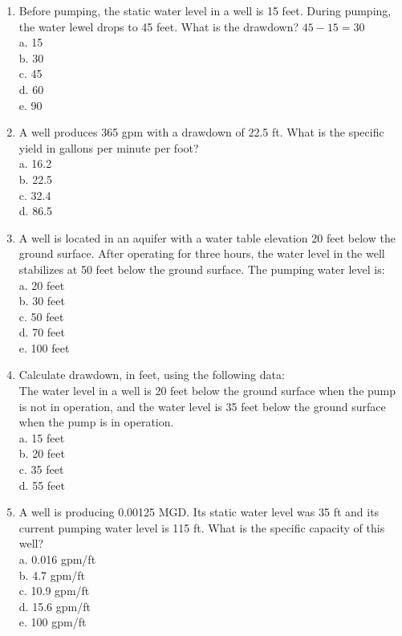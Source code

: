 \documentclass{article}
\begin{document}
\begin{enumerate}
\item Before pumping, the static water level in a well is 15 feet. During pumping, the water lewel drops to 45 feet. What is the drawdown? $45-15=30$\\
a. 15\\
b. 30\\
c. 45\\
d. 60\\
e. 90\\

\item A well produces 365 gpm with a drawdown of 22.5 ft.  What is	the specific yield in gallons per minute per foot?\\
a.	16.2\\
b.	22.5\\
c.	32.4\\
d.	86.5\\

\item A well is located in an aquifer with a water table elevation 20 feet below the ground surface. After operating for three hours, the water level in the well stabilizes at 50 feet below the ground surface. The pumping water level is:\\
a.	20 feet\\
b.  30 feet\\
c.	50 feet\\
d.	70 feet\\
e.	100 feet\\

\item Calculate drawdown, in feet, using the following data:\\
The water level in a well is 20 feet below the ground surface when the pump is not in operation, and the water level is 35 feet below the ground surface when the pump is in operation.\\
a.	15 feet\\
b.	20 feet\\
c.	35 feet\\
d.	55 feet\\

\item A well is producing 0.00125 MGD. Its static water level was 35 ft and its current pumping water level is 115 ft. What is the specific capacity of this well? \\
a. 0.016 gpm/ft\\
b. 4.7 gpm/ft\\
c. 10.9 gpm/ft\\
d. 15.6 gpm/ft\\
e. 100 gpm/ft\\


\end{enumerate}
\end{document}
